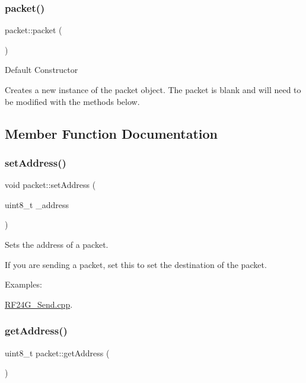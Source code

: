 \subsubsection{\texorpdfstring{packet()}{packet()}}
{\footnotesize\ttfamily packet\+::packet (\begin{DoxyParamCaption}{ }\end{DoxyParamCaption})}

Default Constructor

Creates a new instance of the packet object. The packet is blank and will need to be modified with the methods below. 

\subsection{Member Function Documentation}
\hypertarget{classpacket_adc07da444b32a9105a211862e5b7f6c3}{}\label{classpacket_adc07da444b32a9105a211862e5b7f6c3} 
\subsubsection{\texorpdfstring{set\+Address()}{setAddress()}}
{\footnotesize\ttfamily void packet\+::set\+Address (\begin{DoxyParamCaption}\item[{uint8\+\_\+t}]{\+\_\+address }\end{DoxyParamCaption})}

Sets the address of a packet.

If you are sending a packet, set this to set the destination of the packet. \begin{Desc}
\item[Examples\+: ]\par
\hyperlink{_r_f24_g__send_8cpp-example}{R\+F24\+G\+\_\+\+Send.\+cpp}.\end{Desc}
\hypertarget{classpacket_a87b76aa12540156e0497fa5b094e2470}{}\label{classpacket_a87b76aa12540156e0497fa5b094e2470} 
\subsubsection{\texorpdfstring{get\+Address()}{getAddress()}}
{\footnotesize\ttfamily uint8\+\_\+t packet\+::get\+Address (\begin{DoxyParamCaption}{ }\end{DoxyParamCaption})}

